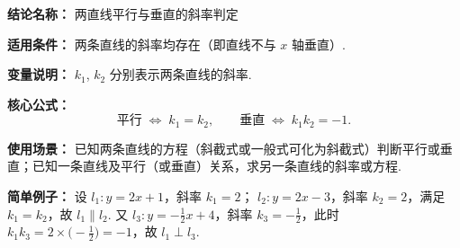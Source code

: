 \textbf{结论名称：} 两直线平行与垂直的斜率判定

\textbf{适用条件：} 两条直线的斜率均存在（即直线不与 $x$ 轴垂直）.

\textbf{变量说明：} $k_1$, $k_2$ 分别表示两条直线的斜率.

\textbf{核心公式：} 
\[
\text{平行}\;\Longleftrightarrow\; \boxed{k_1 = k_2}, \qquad
\text{垂直}\;\Longleftrightarrow\; \boxed{k_1 k_2 = -1}.
\]

\textbf{使用场景：} 已知两条直线的方程（斜截式或一般式可化为斜截式）判断平行或垂直；已知一条直线及平行（或垂直）关系，求另一条直线的斜率或方程.

\textbf{简单例子：} 
设 $l_1: y = 2x + 1$，斜率 $k_1 = 2$；
$l_2: y = 2x - 3$，斜率 $k_2 = 2$，满足 $k_1 = k_2$，故 $l_1 \parallel l_2$.
又 $l_3: y = -\frac12 x + 4$，斜率 $k_3 = -\frac12$，此时 $k_1 k_3 = 2 \times \bigl(-\frac12\bigr) = -1$，故 $l_1 \perp l_3$.